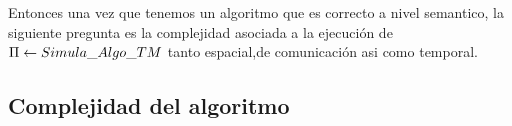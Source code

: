 \documentclass[10pt]{report}
\begin{document}
    Entonces una vez que tenemos un algoritmo que es correcto a nivel semantico,
    la siguiente pregunta es la complejidad asociada a la ejecución de $\Pi \gets Simula\char95Algo\char95TM$
    tanto espacial,de comunicación asi como temporal.
    \subsection{Complejidad del algoritmo}\label{subsec:complejidad-del-algoritmo}
\end{document}

